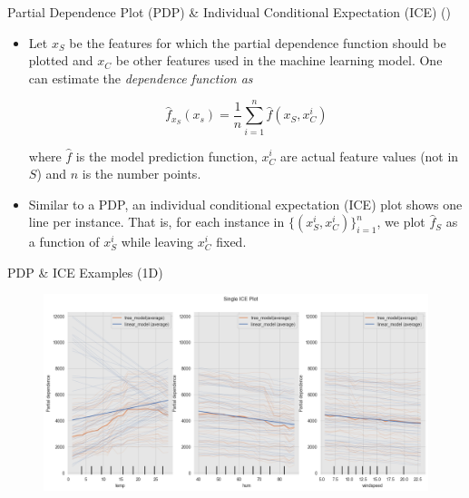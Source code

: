 \documentclass[10pt]{beamer}
\begin{document}
\begin{frame}{Partial Dependence Plot (PDP) \& Individual Conditional Expectation (ICE) (\cite[Section 5.1]{molnar2019})}
\begin{itemize}
\item Let $x_S$ be the features for which the partial dependence function should be plotted and $x_C$ be other features used in the machine learning model. One can estimate the {\em dependence function as}

$$
\hat{f}_{x_{S}}(x_{s}) = 
\frac{1}{n}
\sum_{i=1}^{n}
\hat{f}(x_{S}, x_{C}^{i})
$$

where $\hat{f}$ is the model prediction function, $x_{C}^{i}$ are actual feature values (not in $S$) and $n$ is the number points.

\item Similar to a PDP, an individual conditional expectation (ICE) plot shows one line per instance. That is, for each instance in $\{(x_{S}^{i}, x_{C}^{i})\}_{i=1}^{n}$, we plot $\hat{f}_{S}$ as a function of $x_{S}^{i}$ while leaving $x_{C}^{i}$ fixed.
\end{itemize}
\end{frame}

\begin{frame}{PDP \& ICE Examples (1D)}
\begin{center}
  \begin{figure}
    \includegraphics[scale=0.35]{images/interpretable_ml_99_0.png}
  \end{figure}
\end{center}
\end{frame}
\end{document}
